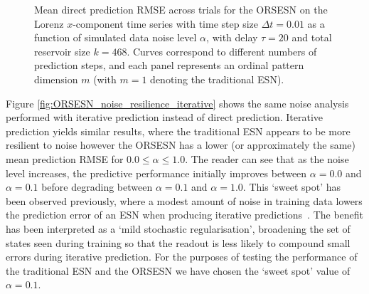\begin{figure}
    \centering
    \caption{Mean direct prediction RMSE across trials for the ORSESN on the Lorenz $x$-component time series with time step size $\Delta t=0.01$ as a function of simulated data noise level $\alpha$, with delay $\tau=20$ and total reservoir size $k=468$. Curves correspond to different numbers of prediction steps, and each panel represents an ordinal pattern dimension $m$ (with $m=1$ denoting the traditional ESN).}
    \label{fig:ORSESN_noise_resilience_direct}
\end{figure}

Figure \ref{fig:ORSESN_noise_resilience_iterative} shows the same noise analysis performed with iterative prediction instead of direct prediction. Iterative prediction yields similar results, where the traditional ESN appears to be more resilient to noise however the ORSESN has a lower (or approximately the same) mean prediction RMSE for $0.0 \leq \alpha \leq 1.0$. The reader can see that as the noise level increases, the predictive performance initially improves between $\alpha = 0.0$ and $\alpha = 0.1$ before degrading between $\alpha = 0.1$ and $\alpha = 1.0$. This `sweet spot' has been observed previously, where a modest amount of noise in training data lowers the prediction error of an ESN when producing iterative predictions~\cite{jaeger_2001}\cite{lukosevicius_and_jaeger_2009}. The benefit has been interpreted as a `mild stochastic regularisation', broadening the set of states seen during training so that the readout is less likely to compound small errors during iterative prediction. For the purposes of testing the performance of the traditional ESN and the ORSESN we have chosen the `sweet spot' value of $\alpha = 0.1$.

